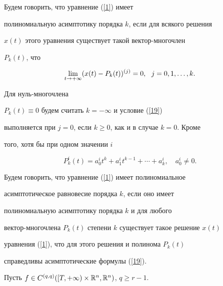 \begin{defn}\label{D_5}


Будем говорить, что уравнение (\ref{1}) имеет


полиномиальную асимптотику порядка $k$, если для всякого решения


$x(t)$ этого уравнения существует такой вектор-многочлен


$P_{k}(t)$, что


\begin{equation}


\label{19}


\lim\limits_{t\rar +\infty}(x(t)-


P_{k}(t))^{(j)}=0,\ \ j=0,1,\dotsc,k.


\end{equation}


Для нуль-многочлена


$P_{k}(t)\equiv 0$ будем считать $k=-\infty$ и условие (\ref{19})


выполняется при $j=0$, если $k\geq 0$, как и в случае $k=0$. Кроме


того, хотя бы при одном значении $i$


$$


P_{k}^{i}(t)=a_{0}^{i}t^{k}+ a_{1}^{i}t^{k-


1}+\dotsb+a_{k}^{i},\quad a_{0}^{i} \ne 0.


$$


\end{defn}





\begin{defn}\label{D_6}


Будем говорить, что уравнение (\ref{1}) имеет полиномиальное


асимптотическое равновесие порядка $k$, если оно имеет


полиномиальную асимптотику порядка $k$ и для любого 


вектор-многочлена $P_{k}(t)$ степени $k$ существует такое решение $x(t)$


уравнения (\ref{1}), что для этого решения и полинома $P_{k}(t)$


справедливы асимптотические формулы (\ref{19}).


\end{defn}





Пусть $f\in C^{(q,q)}([T,+\infty)\times {\Bbb R}^{n},{\Bbb R}^{n})$, $q\geq r-1$.


